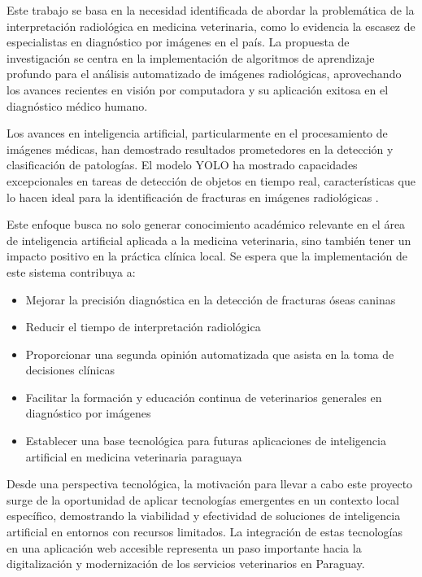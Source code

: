 Este trabajo se basa en la necesidad identificada de abordar la problemática de la interpretación radiológica en medicina veterinaria, como lo evidencia la escasez de especialistas en diagnóstico por imágenes en el país. La propuesta de investigación se centra en la implementación de algoritmos de aprendizaje profundo para el análisis automatizado de imágenes radiológicas, aprovechando los avances recientes en visión por computadora y su aplicación exitosa en el diagnóstico médico humano.

Los avances en inteligencia artificial, particularmente en el procesamiento de imágenes médicas, han demostrado resultados prometedores en la detección y clasificación de patologías. El modelo YOLO ha mostrado capacidades excepcionales en tareas de detección de objetos en tiempo real, características que lo hacen ideal para la identificación de fracturas en imágenes radiológicas \cite{yolo_paper}.

Este enfoque busca no solo generar conocimiento académico relevante en el área de inteligencia artificial aplicada a la medicina veterinaria, sino también tener un impacto positivo en la práctica clínica local. Se espera que la implementación de este sistema contribuya a:

\begin{itemize}
\item Mejorar la precisión diagnóstica en la detección de fracturas óseas caninas
\item Reducir el tiempo de interpretación radiológica
\item Proporcionar una segunda opinión automatizada que asista en la toma de decisiones clínicas
\item Facilitar la formación y educación continua de veterinarios generales en diagnóstico por imágenes
\item Establecer una base tecnológica para futuras aplicaciones de inteligencia artificial en medicina veterinaria paraguaya
\end{itemize}

Desde una perspectiva tecnológica, la motivación para llevar a cabo este proyecto surge de la oportunidad de aplicar tecnologías emergentes en un contexto local específico, demostrando la viabilidad y efectividad de soluciones de inteligencia artificial en entornos con recursos limitados. La integración de estas tecnologías en una aplicación web accesible representa un paso importante hacia la digitalización y modernización de los servicios veterinarios en Paraguay.

